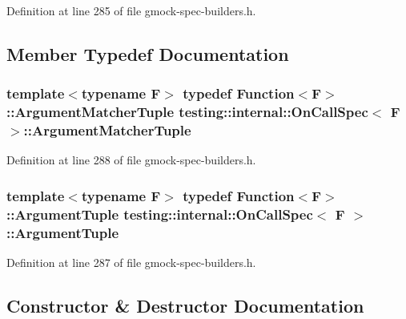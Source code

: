 Definition at line 285 of file gmock-\/spec-\/builders.\+h.



\subsection{Member Typedef Documentation}
\subsubsection[{\texorpdfstring{Argument\+Matcher\+Tuple}{ArgumentMatcherTuple}}]{\setlength{\rightskip}{0pt plus 5cm}template$<$typename F$>$ typedef {\bf Function}$<$F$>$\+::{\bf Argument\+Matcher\+Tuple} {\bf testing\+::internal\+::\+On\+Call\+Spec}$<$ F $>$\+::{\bf Argument\+Matcher\+Tuple}}\hypertarget{classtesting_1_1internal_1_1_on_call_spec_a3240f159f0a9d8cda208bc256da35074}{}\label{classtesting_1_1internal_1_1_on_call_spec_a3240f159f0a9d8cda208bc256da35074}


Definition at line 288 of file gmock-\/spec-\/builders.\+h.

\subsubsection[{\texorpdfstring{Argument\+Tuple}{ArgumentTuple}}]{\setlength{\rightskip}{0pt plus 5cm}template$<$typename F$>$ typedef {\bf Function}$<$F$>$\+::{\bf Argument\+Tuple} {\bf testing\+::internal\+::\+On\+Call\+Spec}$<$ F $>$\+::{\bf Argument\+Tuple}}\hypertarget{classtesting_1_1internal_1_1_on_call_spec_a70ffab8b915b7b48a90f5ce256da806f}{}\label{classtesting_1_1internal_1_1_on_call_spec_a70ffab8b915b7b48a90f5ce256da806f}


Definition at line 287 of file gmock-\/spec-\/builders.\+h.



\subsection{Constructor \& Destructor Documentation}
